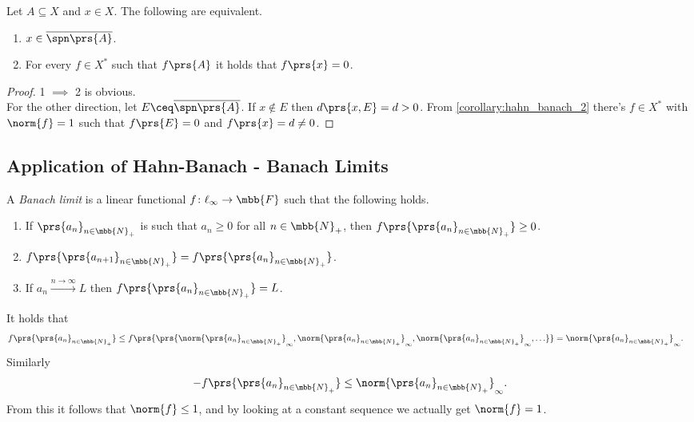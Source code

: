 \documentclass[10pt, twoside]{book}
\begin{document}
\begin{corollary} \label{corollary:hahn_banach_3}
Let $A \subseteq X$ and $x \in X$. The following are equivalent.
\begin{enumerate}
\item $x \in \overline{\spn\prs{A}}$.
\item For every $f \in X^*$ such that $f\prs{A}$ it holds that $f\prs{x} = 0$.
\end{enumerate}
\end{corollary}

\begin{proof}
1 $\implies$ 2 is obvious.
\\
For the other direction, let $E \ceq \overline{\spn\prs{A}}$. If $x \notin E$ then $d\prs{x, E} = d > 0$. From \ref{corollary:hahn_banach_2} there's $f \in X^*$ with $\norm{f} = 1$ such that $f\prs{E} = 0$ and $f\prs{x} = d \neq 0$.
\end{proof}

\subsection{Application of Hahn-Banach - Banach Limits}

\begin{definition}
A \emph{Banach limit} is a linear functional $f \colon \ell_\infty \to \mbb{F}$ such that the following holds.
\begin{enumerate}
\item If $\prs{a_n}_{n \in \mbb{N}_+}$ is such that $a_n \geq 0$ for all $n \in \mbb{N}_+$, then $f\prs{\prs{a_n}_{n \in \mbb{N}_+}} \geq 0$.
\item $f\prs{\prs{a_{n+1}}_{n \in \mbb{N}_+}} = f\prs{\prs{a_n}_{n \in \mbb{N}_+}}$.
\item If $a_n \xrightarrow{n\to\infty} L$ then $f\prs{\prs{a_n}_{n \in \mbb{N}_+}} = L$.
\end{enumerate}
\end{definition}

\begin{remark}
It holds that
\begin{align*}
f\prs{\prs{a_n}_{n \in \mbb{N}_+}} &\leq f\prs{\prs{\norm{\prs{a_n}_{n \in \mbb{N}_+}}_\infty, \norm{\prs{a_n}_{n \in \mbb{N}_+}}_\infty, \norm{\prs{a_n}_{n \in \mbb{N}_+}}_\infty, \ldots}} = \norm{\prs{a_n}_{n \in \mbb{N}_+}}_\infty \text{.}
\end{align*}
Similarly
\[-f\prs{\prs{a_n}_{n \in \mbb{N}_+}} \leq \norm{\prs{a_n}_{n \in \mbb{N}_+}}_\infty \text{.}\]
From this it follows that $\norm{f} \leq 1$, and by looking at a constant sequence we actually get $\norm{f} = 1$.
\end{remark}
\end{document}
